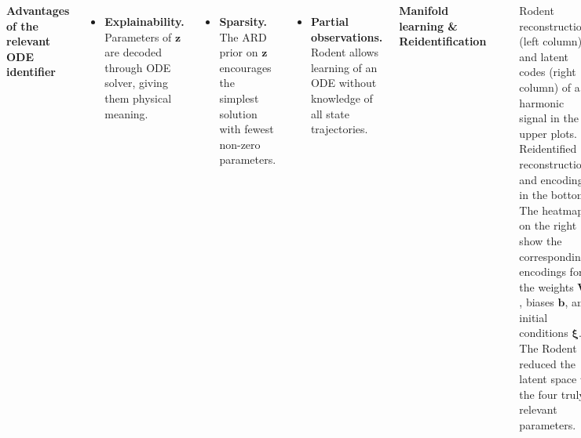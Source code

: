 \documentclass[25pt]{tikzposter}
\begin{document}
\begin{columns}
{    \vspace{1cm}
    \begin{center}
      {\huge\bf Advantages of the relevant ODE identifier}\\
    \end{center}

    \vspace{1cm}
    \begin{minipage}[t]{.28\textwidth}
    \Large
    \begin{itemize}
      \item \textbf{Explainability.}  Parameters of $\bm z$ are
        decoded through ODE solver, giving them physical meaning.
    \end{itemize}
    \end{minipage}
    \hspace{.01\textwidth}
    \begin{minipage}[t]{.28\textwidth}
    \begin{itemize}
      \item \textbf{Sparsity.} The ARD prior on
        $\bm{z}$ encourages the simplest solution with fewest non-zero parameters.
    \end{itemize}
    \end{minipage}
    \hspace{.01\textwidth}
    \begin{minipage}[t]{.28\textwidth}
    \begin{itemize}
      \item \textbf{Partial observations.} Rodent allows learning of an ODE
        without knowledge of all state trajectories. 
    \end{itemize}
    \end{minipage}



    \vspace{1cm}
    \begin{center}
      {\huge\bf Manifold learning \& Reidentification}\\
    \end{center}
    \begin{tikzfigure}
      \includegraphics[width=.60\textwidth]{single_enc_rec.pdf}
    \end{tikzfigure}
    \large
    Rodent reconstructions (left column) and latent codes (right column) of a
    harmonic signal in the upper plots. Reidentified reconstruction and
    encodings in the bottom. The heatmaps on the right show
    the corresponding encodings for the weights $\bm W$, biases $\bm b$, and
    initial conditions $\bm\xi$. The Rodent reduced
    the latent space to the four truly relevant parameters.
  }


\end{columns}
\end{document}
